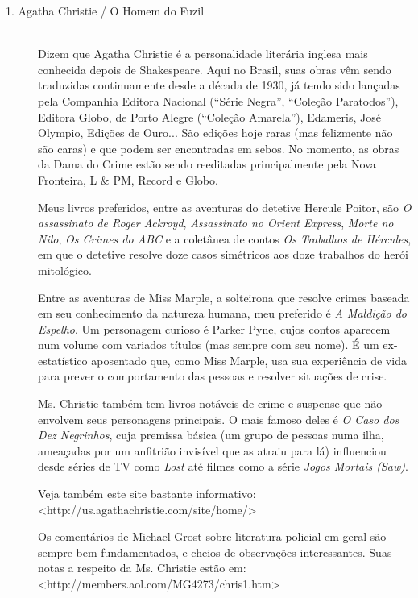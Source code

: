 \begin{description}%
\item[1. Agatha Christie / O Homem do Fuzil]\hfill\\
Dizem que Agatha Christie é a personalidade literária inglesa mais
conhecida depois de Shakespeare.  Aqui no Brasil, suas obras vêm
sendo traduzidas continuamente desde a década de 1930, já tendo sido
lançadas pela Companhia Editora Nacional (“Série Negra”, “Coleção
Paratodos”), Editora Globo, de Porto Alegre (“Coleção Amarela”),
Edameris, José Olympio, Edições de Ouro...  São edições hoje raras
(mas felizmente não são caras) e que podem ser encontradas em sebos. 
No momento, as obras da Dama do Crime estão sendo reeditadas
principalmente pela Nova Fronteira, L \& PM, Record e Globo. 

Meus livros preferidos, entre as aventuras do detetive Hercule Poitor,
são \textit{O assassinato de Roger Ackroyd}, \textit{Assassinato no
Orient Express}, \textit{Morte no Nilo}, \textit{Os Crimes do ABC} e
a coletânea de contos \textit{Os Trabalhos de Hércules}, em que o
detetive resolve doze casos simétricos aos doze trabalhos do herói
mitológico.

Entre as aventuras de Miss Marple, a solteirona que resolve crimes
baseada em seu conhecimento da natureza humana, meu preferido é
\textit{A Maldição do Espelho}.  Um personagem curioso é Parker Pyne,
cujos contos aparecem num volume com variados títulos (mas sempre com
seu nome).  É um ex-estatístico aposentado que, como Miss Marple, usa
sua experiência de vida para prever o comportamento das pessoas e
resolver situações de crise.

Ms. Christie também tem livros notáveis de crime e suspense que não
envolvem seus personagens principais.  O mais famoso deles é
\textit{O Caso dos Dez Negrinhos}, cuja premissa básica (um grupo de
pessoas numa ilha, ameaçadas por um anfitrião invisível que as atraiu
para lá) influenciou desde séries de TV como \textit{Lost} até filmes
como a série \textit{Jogos Mortais (Saw)}. 

Veja também este site bastante informativo:\\
<http://us.agathachristie.com/site/home/>

Os comentários de Michael Grost sobre literatura policial em geral são
sempre bem fundamentados, e cheios de observações interessantes. 
Suas notas a respeito da Ms. Christie estão em:\\
<http://members.aol.com/MG4273/chris1.htm>


\end{description}
